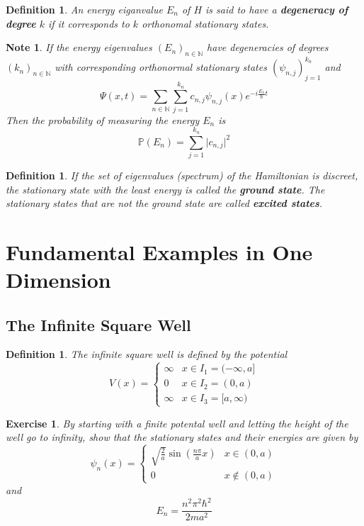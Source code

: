 \documentclass[12pt]{amsart}
\newtheorem{defn}[thm]{Definition}
\newtheorem{note}[thm]{Note}
\newtheorem{ex}[thm]{Exercise}
\newcommand{\N}{\mathbb{N}}
\renewcommand{\P}{\mathbb{P}}
\begin{document}
\begin{defn}
An energy eiganvalue $E_n$ of $H$ is said to have a \textbf{degeneracy of degree} $k$ if it corresponds to $k$ orthonomal stationary states. 
\end{defn}

\begin{note}
If the energy eigenvalues $(E_n)_{n \in \N}$ have degeneracies of degrees $(k_n)_{n \in \N}$ with corresponding orthonormal stationary states $(\psi_{n,j})_{j=1}^{k_n}$ and $$\Psi(x,t) = \sum_{n \in \N} \sum_{j =1}^{k_n}c_{n,j} \psi_{n,j}(x)e^{-i \frac{E_n}{\hbar}t}$$ Then the probability of measuring the energy $E_n$ is $$\P(E_n) = \sum_{j=1}^{k_n} \vert c_{n,j}\vert^2$$
\end{note}

\begin{defn}
If the set of eigenvalues (spectrum) of the Hamiltonian is discreet, the stationary state with the least energy is called the \textbf{ground state}. The stationary states that are not the ground state are called \textbf{excited states}.
\end{defn}

\section{Fundamental Examples in One Dimension}

\subsection{The Infinite Square Well}

\begin{defn}
The infinite square well is defined by the potential 
\[
V(x) = 
\begin{cases}
\infty & x \in I_1 = (-\infty, a]\\
0 & x \in I_2 = (0,a)\\
\infty &x \in I_3 = [a,\infty)
\end{cases}
\]
\end{defn}

\begin{ex}
By starting with a finite potental well and letting the height of the well go to infinity, show that the stationary states and their  energies are given by $$\psi_n(x)= 
\begin{cases}
\sqrt{\frac{2}{a}}\sin(\frac{n \pi}{a}x)  & x \in (0,a) \\
0 & x \not \in (0,a)
\end{cases} $$ 
and 
$$E_n = \frac{n^2 \pi^2 \hbar^2}{2ma^2}$$
\end{ex}
\end{document}
